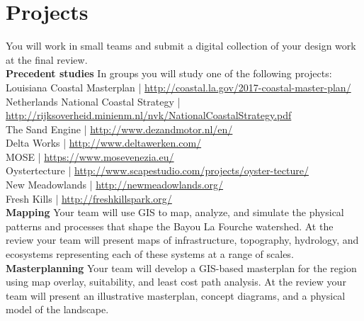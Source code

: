 \documentclass[11pt,article,oneside]{memoir}
\begin{document}
\section{Projects}
\renewcommand*{\bibfont}{\footnotesize}

You will work in small teams 
and submit a digital collection of your design work
at the final review. \\

\noindent \textbf{Precedent studies}
In groups you will study one of the following projects:\\

\noindent
Louisiana Coastal Masterplan | \url{http://coastal.la.gov/2017-coastal-master-plan/}\\
Netherlands National Coastal Strategy | \\
\url{http://rijksoverheid.minienm.nl/nvk/NationalCoastalStrategy.pdf}\\
The Sand Engine | \url{http://www.dezandmotor.nl/en/}\\
Delta Works | \url{http://www.deltawerken.com/}\\
MOSE | \url{https://www.mosevenezia.eu/}\\
Oystertecture | \url{http://www.scapestudio.com/projects/oyster-tecture/}\\
New Meadowlands | \url{http://newmeadowlands.org/}\\
Fresh Kills | \url{http://freshkillspark.org/}\\

\noindent \textbf{Mapping}
Your team will use GIS to map, analyze, and simulate 
the physical patterns and processes that shape
the Bayou La Fourche watershed. 
At the review your team will present
maps of infrastructure, topography, hydrology, and ecosystems
representing each of these systems at a range of scales. 
\\

\noindent \textbf{Masterplanning}
Your team will develop a GIS-based masterplan for the region 
using map overlay, suitability, and least cost path analysis. 
At the review your team will present
an illustrative masterplan, concept diagrams,
and a physical model of the landscape.
\\
\end{document}
